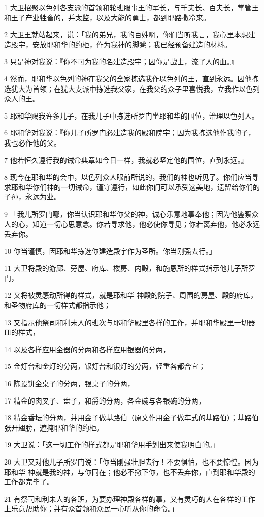 \par 1 大卫招聚以色列各支派的首领和轮班服事王的军长，与千夫长、百夫长，掌管王和王子产业牲畜的，并太监，以及大能的勇士，都到耶路撒冷来。
\par 2 大卫王就站起来，说：「我的弟兄，我的百姓啊，你们当听我言，我心里本想建造殿宇，安放耶和华的约柜，作为我神的脚凳；我已经预备建造的材料。
\par 3 只是神对我说：『你不可为我的名建造殿宇；因你是战士，流了人的血。』
\par 4 然而，耶和华以色列的神在我父的全家拣选我作以色列的王，直到永远。因他拣选犹大为首领；在犹大支派中拣选我父家，在我父的众子里喜悦我，立我作以色列众人的王。
\par 5 耶和华赐我许多儿子，在我儿子中拣选所罗门坐耶和华的国位，治理以色列人。
\par 6 耶和华对我说：『你儿子所罗门必建造我的殿和院宇；因为我拣选他作我的子，我也必作他的父。
\par 7 他若恒久遵行我的诫命典章如今日一样，我就必坚定他的国位，直到永远。』
\par 8 现今在耶和华的会中，以色列众人眼前所说的，我们的神也听见了。你们应当寻求耶和华你们神的一切诫命，谨守遵行，如此你们可以承受这美地，遗留给你们的子孙，永远为业。
\par 9 「我儿所罗门哪，你当认识耶和华你父的神，诚心乐意地事奉他；因为他鉴察众人的心，知道一切心思意念。你若寻求他，他必使你寻见；你若离弃他，他必永远丢弃你。
\par 10 你当谨慎，因耶和华拣选你建造殿宇作为圣所。你当刚强去行。」
\par 11 大卫将殿的游廊、旁屋、府库、楼房、内殿，和施恩所的样式指示他儿子所罗门，
\par 12 又将被灵感动所得的样式，就是耶和华 神殿的院子、周围的房屋、殿的府库，和圣物府库的一切样式都指示他；
\par 13 又指示他祭司和利未人的班次与耶和华殿里各样的工作，并耶和华殿里一切器皿的样式，
\par 14 以及各样应用金器的分两和各样应用银器的分两，
\par 15 金灯台和金灯的分两，银灯台和银灯的分两，轻重各都合宜；
\par 16 陈设饼金桌子的分两，银桌子的分两，
\par 17 精金的肉叉子、盘子，和爵的分两，各金碗与各银碗的分两，
\par 18 精金香坛的分两，并用金子做基路伯（原文作用金子做车式的基路伯）；基路伯张开翅膀，遮掩耶和华的约柜。
\par 19 大卫说：「这一切工作的样式都是耶和华用手划出来使我明白的。」
\par 20 大卫又对他儿子所罗门说：「你当刚强壮胆去行！不要惧怕，也不要惊惶。因为耶和华 神就是我的神，与你同在；他必不撇下你，也不丢弃你，直到耶和华殿的工作都完毕了。
\par 21 有祭司和利未人的各班，为要办理神殿各样的事，又有灵巧的人在各样的工作上乐意帮助你；并有众首领和众民一心听从你的命令。」

